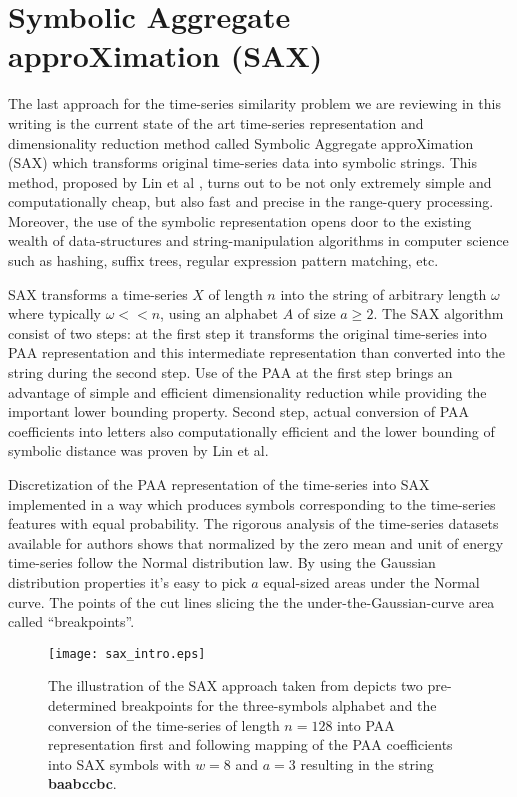\section{Symbolic Aggregate approXimation (SAX)}
The last approach for the time-series similarity problem we are reviewing in this writing is the current state of the art time-series representation and dimensionality reduction method called Symbolic Aggregate approXimation (SAX) which transforms original time-series data into symbolic strings. This method, proposed by Lin et al \cite{citeulike:2821475}, turns out to be not only extremely simple and computationally cheap, but also fast and precise in the range-query processing. Moreover, the use of the symbolic representation opens door to the existing wealth of data-structures and string-manipulation algorithms in computer science such as hashing, suffix trees, regular expression pattern matching, etc.

SAX transforms a time-series $X$ of length $n$ into the string of arbitrary length $\omega$ where typically $\omega << n$, using an alphabet $A$ of size $ a \geq 2$. The SAX algorithm consist of two steps: at the first step it transforms the original time-series into PAA representation and this intermediate representation than converted into the string during the second step. Use of the PAA at the first step brings an advantage of simple and efficient dimensionality reduction while providing the important lower bounding property. Second step, actual conversion of PAA coefficients into letters also computationally efficient and the lower bounding of symbolic distance was proven by Lin et al.

Discretization of the PAA representation of the time-series into SAX implemented in a way which produces symbols corresponding to the time-series features with equal probability. The rigorous analysis of the time-series datasets available for authors shows that normalized by the zero mean and unit of energy time-series follow the Normal distribution law. By using the Gaussian distribution properties \cite{citeulike:167581} it's easy to pick $a$ equal-sized areas under the Normal curve. The points of the cut lines slicing the the under-the-Gaussian-curve area called ``breakpoints''.
\begin{figure}[tbp]
   \centering
   \texttt{[image: sax\_intro.eps]}
   \caption{The illustration of the SAX approach taken from \cite{citeulike:2821475} depicts two pre-determined breakpoints for the three-symbols alphabet and the conversion of the time-series of length $n=128$ into PAA representation first and following mapping of the PAA coefficients into SAX symbols with $w=8$ and $a=3$ resulting in the string \textbf{baabccbc}.}
   \label{fig:sax_intro}
\end{figure}

